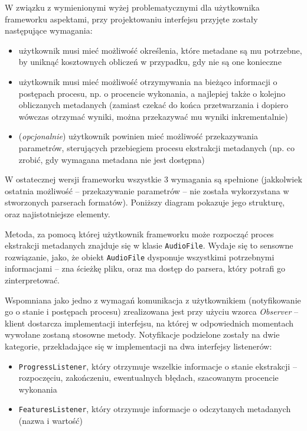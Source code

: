 W związku z wymienionymi wyżej problematycznymi dla użytkownika frameworku aspektami, przy
projektowaniu interfejsu przyjęte zostały następujące wymagania:

\begin{itemize}

  \item użytkownik musi mieć możliwość określenia, które metadane są mu potrzebne, by uniknąć
kosztownych obliczeń w przypadku, gdy nie są one konieczne

  \item użytkownik musi mieć możliwość otrzymywania na bieżąco informacji o postępach procesu, np. o
procencie wykonania, a najlepiej także o kolejno obliczanych metadanych (zamiast czekać do końca
przetwarzania i dopiero wówczas otrzymać wyniki, można przekazywać mu wyniki inkrementalnie)

  \item (\emph{opcjonalnie}) użytkownik powinien mieć możliwość przekazywania parametrów,
sterujących przebiegiem procesu ekstrakcji metadanych (np. co zrobić, gdy wymagana metadana nie jest
dostępna)

\end{itemize}

W ostatecznej wersji frameworku wszystkie 3 wymagania są spełnione (jakkolwiek ostatnia możliwość --
przekazywanie parametrów -- nie została wykorzystana w stworzonych parserach formatów). Poniższy
diagram pokazuje jego strukturę, oraz najistotniejsze elementy.



Metoda, za pomocą której użytkownik frameworku może rozpocząć proces ekstrakcji metadanych znajduje
się w klasie \texttt{AudioFile}. Wydaje się to sensowne rozwiązanie, jako, że obiekt
\texttt{AudioFile} dysponuje wszystkimi potrzebnymi informacjami -- zna ścieżkę pliku, oraz ma
dostęp do parsera, który potrafi go zinterpretować.

Wspomniana jako jedno z wymagań komunikacja z użytkownikiem (notyfikowanie go o stanie i postępach
procesu) zrealizowana jest przy użyciu wzorca \emph{Observer} -- klient dostarcza implementacji
interfejsu, na której w odpowiednich momentach wywołane zostaną stosowne metody. Notyfikacje
podzielone zostały na dwie kategorie, przekładające się w implementacji na dwa interfejsy
listenerów:

\begin{itemize}

  \item \texttt{ProgressListener}, który otrzymuje wszelkie informacje o stanie ekstrakcji -- rozpoczęciu, zakończeniu, ewentualnych błędach, szacowanym procencie wykonania

  \item \texttt{FeaturesListener}, który otrzymuje informacje o odczytanych metadanych (nazwa i
wartość)

\end{itemize}

